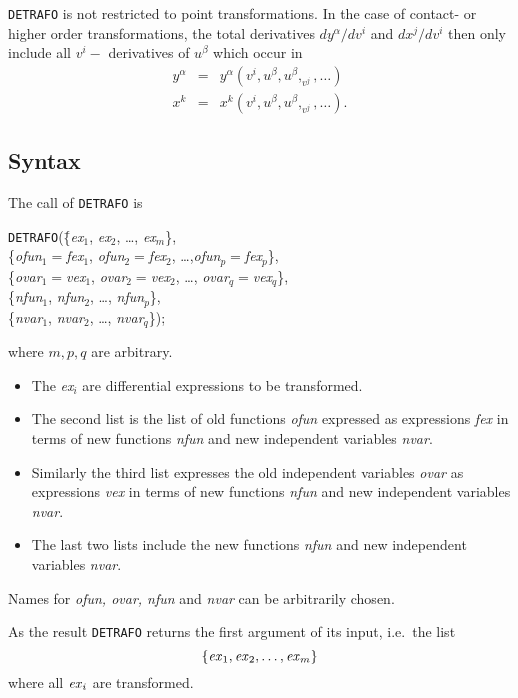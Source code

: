 {\tt DETRAFO} is not restricted to point transformations.
In the case of
contact- or higher order transformations, the total
derivatives $dy^{\alpha}/dv^i$ and $dx^j/dv^i$ then only include all
$v^i-$ derivatives of $u^{\beta}$ which occur in
\begin{eqnarray*}
y^{\alpha} & = & y^{\alpha}(v^i,u^{\beta},u^{\beta},_{v^j},\ldots) \\
x^k        & = & x^k(v^i,u^{\beta},u^{\beta},_{v^j},\ldots).
\end{eqnarray*}
\subsection{Syntax}
The call of {\tt DETRAFO} is
\begin{tabbing}
{\tt DETRAFO}(\=\{{\it ex}$_1$, {\it ex}$_2$, \ldots , {\it ex}$_m$\}, \\
              \>\{{\it ofun}$_1=${\it fex}$_1$, {\it ofun}$_2=${\it fex}$_2$,
               \ldots ,{\it ofun}$_p=${\it fex}$_p$\},  \\
              \>\{{\it ovar}$_1=${\it vex}$_1$, {\it ovar}$_2=${\it vex}$_2$, \ldots ,
                  {\it ovar}$_q=${\it vex}$_q$\},  \\
              \>\{{\it nfun}$_1$, {\it nfun}$_2$, \ldots , {\it nfun}$_p$\},\\
              \>\{{\it nvar}$_1$, {\it nvar}$_2$, \ldots , {\it nvar}$_q$\});
\end{tabbing}
where $m,p,q$ are arbitrary.
\begin{itemize}
\item
The {\it ex}$_i$ are differential expressions to be transformed.
\item
The second list is the list of old functions {\it ofun} expressed
as expressions {\it fex} in terms
of new functions {\it nfun} and new independent variables {\it nvar}.
\item
Similarly the third list expresses the old independent variables {\it ovar}
as expressions {\it vex} in terms of new functions
{\it nfun} and new independent variables {\it nvar}.
\item
The last two lists include the new functions {\it nfun}
and new independent variables {\it nvar}.
\end{itemize}
Names for {\it ofun, ovar, nfun} and {\it nvar} can be arbitrarily
chosen.

As the result {\tt DETRAFO} returns the first argument of its input,
i.e.\ the list
\[\{{\it ex}_1, {\it ex}_2, \ldots , {\it ex}_m\}\]
where all ${\it ex}_i$ are transformed.
